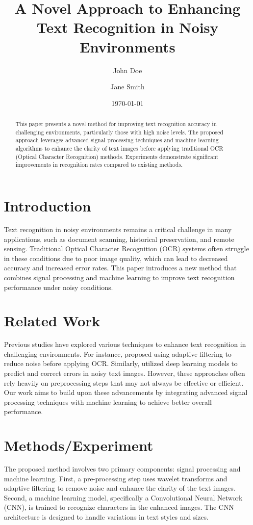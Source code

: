 \documentclass{article}
\title{A Novel Approach to Enhancing Text Recognition in Noisy Environments}
\author{John Doe \and Jane Smith}
\date{\today}
\begin{document}
\maketitle

\begin{abstract}
This paper presents a novel method for improving text recognition accuracy in challenging environments, particularly those with high noise levels. The proposed approach leverages advanced signal processing techniques and machine learning algorithms to enhance the clarity of text images before applying traditional OCR (Optical Character Recognition) methods. Experiments demonstrate significant improvements in recognition rates compared to existing methods.
\end{abstract}

\section{Introduction}
Text recognition in noisy environments remains a critical challenge in many applications, such as document scanning, historical preservation, and remote sensing. Traditional Optical Character Recognition (OCR) systems often struggle in these conditions due to poor image quality, which can lead to decreased accuracy and increased error rates. This paper introduces a new method that combines signal processing and machine learning to improve text recognition performance under noisy conditions.

\section{Related Work}
Previous studies have explored various techniques to enhance text recognition in challenging environments. For instance, \cite{ref1} proposed using adaptive filtering to reduce noise before applying OCR. Similarly, \cite{ref2} utilized deep learning models to predict and correct errors in noisy text images. However, these approaches often rely heavily on preprocessing steps that may not always be effective or efficient. Our work aims to build upon these advancements by integrating advanced signal processing techniques with machine learning to achieve better overall performance.

\section{Methods/Experiment}
The proposed method involves two primary components: signal processing and machine learning. First, a pre-processing step uses wavelet transforms and adaptive filtering to remove noise and enhance the clarity of the text images. Second, a machine learning model, specifically a Convolutional Neural Network (CNN), is trained to recognize characters in the enhanced images. The CNN architecture is designed to handle variations in text styles and sizes.
\end{document}
